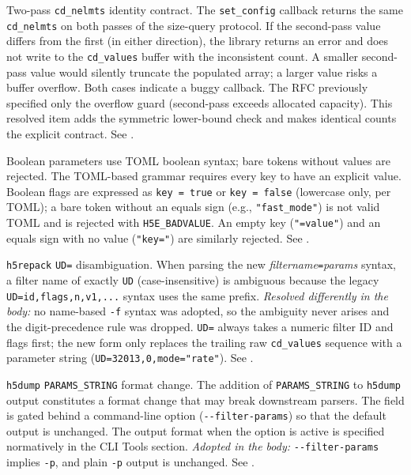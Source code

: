 \documentclass[../RFC-HDFG-2026-001.tex]{subfiles}
\begin{document}
Two-pass \texttt{cd\_nelmts} identity contract. The \texttt{set\_config} callback
returns the same \texttt{cd\_nelmts} on both passes of the size-query protocol. If
the second-pass value differs from the first (in either direction), the
library returns an error and does not write to the \texttt{cd\_values} buffer
with the inconsistent count. A smaller second-pass value would silently
truncate the populated array; a larger value risks a buffer overflow. Both
cases indicate a buggy callback. The RFC previously specified only the
overflow guard (second-pass exceeds allocated capacity). This resolved item
adds the symmetric lower-bound check and makes identical counts the explicit
contract. See .

Boolean parameters use TOML boolean syntax; bare tokens without values are
rejected. The TOML-based grammar requires every key to have an explicit value.
Boolean flags are expressed as \texttt{key = true} or \texttt{key = false}
(lowercase only, per TOML); a bare token without an equals sign (e.g.,
\texttt{"fast\_mode"}) is not valid TOML and is rejected with
\texttt{H5E\_BADVALUE}.  An empty key (\texttt{"=value"}) and an equals sign
with no value (\texttt{"key="}) are similarly rejected.
See .

\texttt{h5repack} \texttt{UD=} disambiguation. When parsing the new
\textit{filtername}\texttt{=}\textit{params} syntax, a filter name of exactly \texttt{UD}
(case-insensitive) is ambiguous because the legacy \texttt{UD=id,flags,n,v1,...}
syntax uses the same prefix.  \emph{Resolved differently in the body:} no
name-based \texttt{-f} syntax was adopted, so the ambiguity never arises and
the digit-precedence rule was dropped.  \texttt{UD=} always takes a numeric
filter ID and flags first; the new form only replaces the trailing raw
\texttt{cd\_values} sequence with a parameter string
(\texttt{UD=32013,0,mode="rate"}).  See .

\texttt{h5dump} \texttt{PARAMS\_STRING} format change. The addition of
\texttt{PARAMS\_STRING} to \texttt{h5dump} output constitutes a format change that may
break downstream parsers. The field is gated behind a command-line option
(\texttt{-{}-filter-params}) so that the default output is unchanged. The output
format when the option is active is specified normatively in the CLI Tools
section.  \emph{Adopted in the body:} \texttt{-{}-filter-params} implies
\texttt{-p}, and plain \texttt{-p} output is unchanged.  See
.
\end{document}
